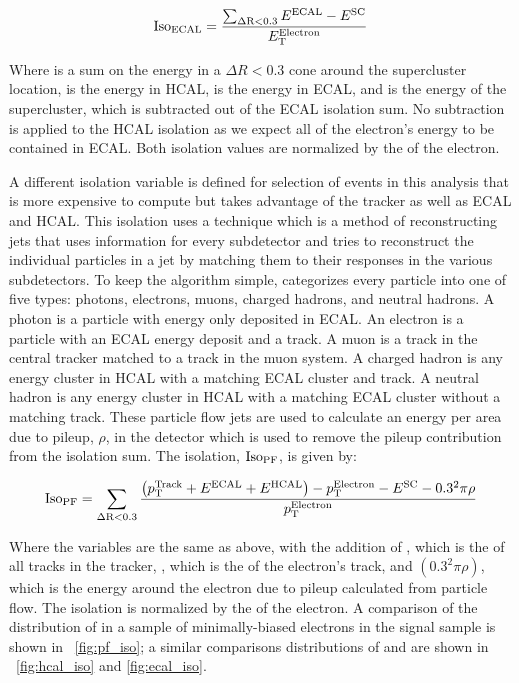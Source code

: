 \begin{equation}
    \text{Iso}_{\text{ECAL}} = \frac{\sum_{\Delta \text{R}<0.3} E^{\text{ECAL}} - E^{\text{SC}}}{E_{\mathrm{T}}^{\text{Electron}}}
\end{equation}

Where \DeltaRSum is a sum on the energy in a $\Delta R < 0.3$ cone around the
supercluster location, \EHCAL is the energy in HCAL, \EECAL is the energy in
ECAL, and \ESC is the energy of the supercluster, which is subtracted out of
the ECAL isolation sum. No subtraction is applied to the HCAL isolation as we
expect all of the electron's energy to be contained in ECAL. Both isolation
values are normalized by the \et of the electron.

A different isolation variable is defined for selection of events in this
analysis that is more expensive to compute but takes advantage of the tracker
as well as ECAL and HCAL. This isolation uses a
\particleflow\cite{particle_flow_2010} technique which is a method of
reconstructing jets that uses information for every subdetector and tries to
reconstruct the individual particles in a jet by matching them to their
responses in the various subdetectors. To keep the algorithm simple,
\particleflow categorizes every particle into one of five types: photons,
electrons, muons, charged hadrons, and neutral hadrons. A photon is a particle
with energy only deposited in ECAL. An electron is a particle with an ECAL
energy deposit and a track. A muon is a track in the central tracker matched to
a track in the muon system. A charged hadron is any energy cluster in HCAL with
a matching ECAL cluster and track. A neutral hadron is any energy cluster in
HCAL with a matching ECAL cluster without a matching track. These particle flow
jets are used to calculate an energy per area due to pileup, $\rho$, in the
detector which is used to remove the pileup contribution from the isolation
sum. The \particleflow isolation, $\text{Iso}_{\text{PF}}$, is given by:

\begin{equation}
    \text{Iso}_{\text{PF}} = \sum_{\Delta \text{R}<0.3} \frac{\left(p_{\mathrm{T}}^{\text{Track}} + E^{\text{ECAL}} + E^{\text{HCAL}}\right) - p_{\mathrm{T}}^{\text{Electron}}
    - E^{\text{SC}} - 0.3^{2} \pi \rho}{p_{\mathrm{T}}^{\text{Electron}}}
\end{equation}

Where the variables are the same as above, with the addition of \ptTrack, which
is the \pt of all tracks in the tracker, \ptElectron, which is the \pt of the
electron's track, and $\left(0.3^{2} \pi \rho\right)$, which is the energy
around the electron due to pileup calculated from particle flow. The
\particleflow isolation is normalized by the \pt of the electron. A comparison
of the distribution of \PFISO in a sample of minimally-biased electrons in the
\MADGRAPH signal sample is shown in \FIG~\ref{fig:pf_iso}; a similar
comparisons distributions of \HCALISO and \ECALISO are shown in
\FIGS~\ref{fig:hcal_iso} and \ref{fig:ecal_iso}.

